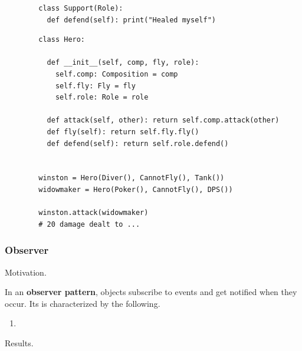 \begin{example}[Overwatch]
\begin{lstlisting}
        class Support(Role): 
          def defend(self): print("Healed myself")
      \end{lstlisting} 

      \begin{lstlisting}
        class Hero: 

          def __init__(self, comp, fly, role): 
            self.comp: Composition = comp 
            self.fly: Fly = fly 
            self.role: Role = role 

          def attack(self, other): return self.comp.attack(other)
          def fly(self): return self.fly.fly() 
          def defend(self): return self.role.defend()


        winston = Hero(Diver(), CannotFly(), Tank()) 
        widowmaker = Hero(Poker(), CannotFly(), DPS()) 

        winston.attack(widowmaker) 
        # 20 damage dealt to ...
      \end{lstlisting}
    \end{example}

  \subsubsection{Observer} 

    Motivation. 

    \begin{definition}
      \label{def:observer-pattern}
      In an \textbf{observer pattern}, objects subscribe to events and get notified when they occur. Its is characterized by the following. 
      \begin{enumerate}
        \item 
      \end{enumerate}
    \end{definition}

    Results. 

